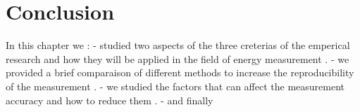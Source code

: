 
\section{Conclusion }
In this chapter we :
- studied two aspects of the three creterias of the emperical research and how they will be applied in the field of energy measurement .
- we provided a brief comparaison of different methods to increase the reproducibility of the measurement .
- we studied the factors that can affect the measurement accuracy and how to reduce them .
- and finally








